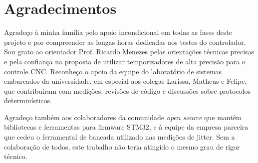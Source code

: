 \chapter*{Agradecimentos}

Agradeço à minha família pelo apoio incondicional em todas as fases deste
projeto e por compreender as longas horas dedicadas aos testes do
controlador. Sou grato ao orientador Prof. Ricardo Menezes pelas
orientações técnicas precisas e pela confiança na proposta de utilizar
temporizadores de alta precisão para o controle CNC. Reconheço o apoio
da equipe do laboratório de sistemas embarcados da universidade, em
especial aos colegas Larissa, Matheus e Felipe, que contribuíram com
medições, revisões de código e discussões sobre protocolos determinísticos.

Agradeço também aos colaboradores da comunidade \emph{open source} que
mantêm bibliotecas e ferramentas para firmware STM32, e à equipe da
empresa parceira que cedeu o ferramental de bancada utilizado nas
medições de jitter. Sem a colaboração de todos, este trabalho não teria
atingido o mesmo grau de rigor técnico.
